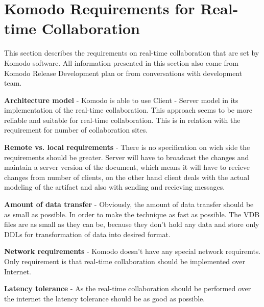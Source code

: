 \documentclass[12pt,oneside]{fithesis2}
\begin{document}
\section{Komodo Requirements for Real-time Collaboration} \label{requirements}
\par This section describes the requirements on real-time collaboration that are set by Komodo software. All information presented in this section also come from Komodo Release Development plan \cite{Komodo} or from conversations with development team.

\vspace{3mm} 

\textbf{Architecture model} - Komodo is able to use Client - Server model in its implementation of the real-time collaboration. This approach seems to be more reliable and suitable for real-time collaboration. This is in relation with the requirement for number of collaboration sites.

\vspace{3mm} 

\textbf{Remote vs. local requirements} - There is no specification on wich side the requirements should be greater. Server will have to broadcast the changes and maintain a server version of the document, which means it will have to recieve changes from number of clients, on the other hand client deals with the actual modeling of the artifact and also with sending and recieving messages.

\vspace{3mm} 

\textbf{Amount of data transfer} - Obviously, the amount of data transfer should be as small as possible. In order to make the technique as fast as possible. The VDB files are as small as they can be, because they don't hold any data and store only DDLs for transformation of data into desired format.

\vspace{3mm} 

\textbf{Network requirements} - Komodo doesn't have any special network requiremts. Only requirement is that real-time collaboration should be implemented over Internet.

\vspace{3mm} 

\textbf{Latency tolerance} - As the real-time collaboration should be performed over the internet the latency tolerance should be as good as possible.

\vspace{3mm} 
\end{document}
